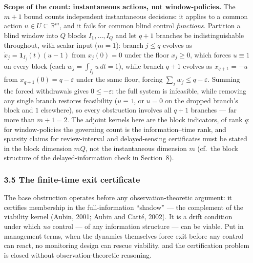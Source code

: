 \documentclass[10pt,twocolumn]{article}
\theoremstyle{definition}
\begin{document}
\textbf{Scope of the count: instantaneous actions, not window-policies.}
The \(m+1\) bound counts independent instantaneous decisions: it applies to a
common action \(u \in U \subseteq \mathbb{R}^m\), and it fails for common blind
control \emph{functions}. Partition a blind window into \(Q\) blocks
\(I_1, \dots, I_Q\) and let \(q + 1\) branches be indistinguishable throughout,
with scalar input (\(m = 1\)): branch \(j \le q\) evolves as
\(\dot x_j = \mathbf{1}_{I_j}(t)(u - 1)\) from \(x_j(0) = 0\) under the floor
\(x_j \ge 0\), which forces \(u \equiv 1\) on every block (each
\(w_j = \int_{I_j} u \, dt = 1\)), while branch \(q+1\) evolves as
\(\dot x_{q+1} = -u\) from \(x_{q+1}(0) = q - \varepsilon\) under the same
floor, forcing \(\sum_j w_j \le q - \varepsilon\). Summing the forced
withdrawals gives \(0 \le -\varepsilon\): the full system is infeasible, while
removing any single branch restores feasibility (\(u \equiv 1\), or \(u = 0\)
on the dropped branch's block and \(1\) elsewhere), so every obstruction
involves all \(q+1\) branches --- far more than \(m + 1 = 2\). The adjoint
kernels here are the block indicators, of rank \(q\): for window-policies the
governing count is the information--time rank, and sparsity claims for
review-interval and delayed-sensing certificates must be stated in the block
dimension \(mQ\), not the instantaneous dimension \(m\) (cf.\ the block
structure of the delayed-information check in Section~8).

\subsubsection{3.5 The finite-time exit
certificate}\label{the-finite-time-exit-certificate}

The base obstruction operates before any observation-theoretic argument: it
certifies membership in the full-information ``shadow'' --- the
complement of the viability kernel (Aubin, 2001; Aubin and
Catt\'e, 2002).
It is a drift condition under which \emph{no} control --- of any
information structure --- can be viable. Put in management terms, when the dynamics themselves force exit before any control can react, no monitoring design can rescue viability, and the certification problem is closed without observation-theoretic reasoning.
\end{document}
